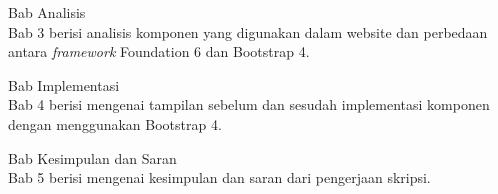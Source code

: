 \begin{singlespace}
\noindent Bab Analisis \\
Bab 3 berisi analisis komponen yang digunakan dalam website dan perbedaan antara \textit{framework} Foundation 6 dan Bootstrap 4.
\end{singlespace}

\begin{singlespace}
\noindent Bab Implementasi \\
Bab 4 berisi mengenai tampilan sebelum dan sesudah implementasi komponen dengan menggunakan Bootstrap 4.
\end{singlespace}

\begin{singlespace}
\noindent Bab Kesimpulan dan Saran \\
Bab 5 berisi mengenai kesimpulan dan saran dari pengerjaan skripsi.
\end{singlespace}
